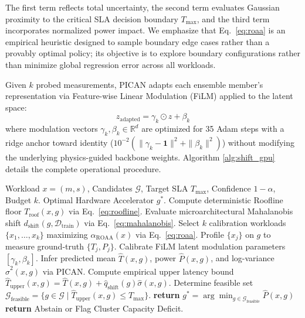 \documentclass[preprint,12pt]{elsarticle}
\begin{document}
The first term reflects total uncertainty, the second term evaluates Gaussian proximity to the critical SLA decision boundary $T_{\max}$, and the third term incorporates normalized power impact. We emphasize that Eq.~\eqref{eq:roaa} is an empirical heuristic designed to sample boundary edge cases rather than a provably optimal policy; its objective is to explore boundary configurations rather than minimize global regression error across all workloads. 

Given $k$ probed measurements, PICAN adapts each ensemble member's representation via Feature-wise Linear Modulation (FiLM) \citep{perez2018film} applied to the latent space:
\begin{equation}
z_{\text{adapted}} = \gamma_k \odot z + \beta_k
\end{equation}
where modulation vectors $\gamma_k, \beta_k \in \mathbb{R}^d$ are optimized for 35 Adam steps with a ridge anchor toward identity ($10^{-2}(\|\gamma_k - \mathbf{1}\|^2 + \|\beta_k\|^2)$) without modifying the underlying physics-guided backbone weights. Algorithm \ref{alg:shift_gpu} details the complete operational procedure.

\begin{algorithm}[t]
\caption{SHIFT-GPU Admission Control, Conformal Risk Calibration, and Active Adaptation}
\label{alg:shift_gpu}
\begin{algorithmic}[1]
\REQUIRE Workload $x = (m, s)$, Candidates $\mathcal{G}$, Target SLA $T_{\max}$, Confidence $1-\alpha$, Budget $k$.
\ENSURE Optimal Hardware Accelerator $g^*$.
    \STATE Compute deterministic Roofline floor $T_{\text{roof}}(x, g)$ via Eq.~\eqref{eq:roofline}.
    \STATE Evaluate microarchitectural Mahalanobis shift $d_{\text{shift}}(g, \mathcal{D}_{\text{train}})$ via Eq.~\eqref{eq:mahalanobis}.
        \STATE Select $k$ calibration workloads $\{x_1, \dots, x_k\}$ maximizing $\alpha_{\text{ROAA}}(x)$ via Eq.~\eqref{eq:roaa}.
        \STATE Profile $\{x_j\}$ on $g$ to measure ground-truth $\{T_j, P_j\}$.
        \STATE Calibrate FiLM latent modulation parameters $[\gamma_k, \beta_k]$.
    \ENDIF
    \STATE Infer predicted mean $\hat{T}(x, g)$, power $\hat{P}(x, g)$, and log-variance $\hat{\sigma}^2(x, g)$ via PICAN.
    \STATE Compute empirical upper latency bound $\hat{T}_{\text{upper}}(x, g) = \hat{T}(x, g) + \hat{q}_{\text{shift}}(g) \hat{\sigma}(x, g)$.
\ENDFOR
\STATE Determine feasible set $\mathcal{G}_{\text{feasible}} = \{g \in \mathcal{G} \mid \hat{T}_{\text{upper}}(x, g) \le T_{\max}\}$.
    \STATE \textbf{return} $g^* = \arg\min_{g \in \mathcal{G}_{\text{feasible}}} \hat{P}(x, g)$
\ELSE
    \STATE \textbf{return} Abstain or Flag Cluster Capacity Deficit.
\ENDIF
\end{algorithmic}
\end{algorithm}
\end{document}
